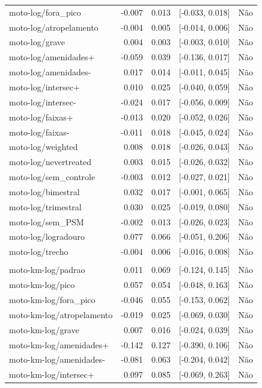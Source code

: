 \begin{longtable}{lrrcl}
moto-log/fora\_pico & -0.007 & 0.013 & {}[-0.033, 0.018] & Não\\
moto-log/atropelamento & -0.004 & 0.005 & {}[-0.014, 0.006] & Não\\
moto-log/grave & 0.004 & 0.003 & {}[-0.003, 0.010] & Não\\
moto-log/amenidades+ & -0.059 & 0.039 & {}[-0.136, 0.017] & Não\\
moto-log/amenidades- & 0.017 & 0.014 & {}[-0.011, 0.045] & Não\\
moto-log/intersec+ & 0.010 & 0.025 & {}[-0.040, 0.059] & Não\\
moto-log/intersec- & -0.024 & 0.017 & {}[-0.056, 0.009] & Não\\
moto-log/faixas+ & -0.013 & 0.020 & {}[-0.052, 0.026] & Não\\
moto-log/faixas- & -0.011 & 0.018 & {}[-0.045, 0.024] & Não\\
moto-log/weighted & 0.008 & 0.018 & {}[-0.026, 0.043] & Não\\
moto-log/nevertreated & 0.003 & 0.015 & {}[-0.026, 0.032] & Não\\
moto-log/sem\_controle & -0.003 & 0.012 & {}[-0.027, 0.021] & Não\\
moto-log/bimestral & 0.032 & 0.017 & {}[-0.001, 0.065] & Não\\
moto-log/trimestral & 0.030 & 0.025 & {}[-0.019, 0.080] & Não\\
moto-log/sem\_PSM & -0.002 & 0.013 & {}[-0.026, 0.023] & Não\\
moto-log/logradouro & 0.077 & 0.066 & {}[-0.051, 0.206] & Não\\
moto-log/trecho & -0.004 & 0.006 & {}[-0.016, 0.008] & Não\\
 &  &  &  & \\
moto-km-log/padrao & 0.011 & 0.069 & {}[-0.124, 0.145] & Não\\
moto-km-log/pico & 0.057 & 0.054 & {}[-0.048, 0.163] & Não\\
moto-km-log/fora\_pico & -0.046 & 0.055 & {}[-0.153, 0.062] & Não\\
moto-km-log/atropelamento & -0.019 & 0.025 & {}[-0.069, 0.030] & Não\\
moto-km-log/grave & 0.007 & 0.016 & {}[-0.024, 0.039] & Não\\
moto-km-log/amenidades+ & -0.142 & 0.127 & {}[-0.390, 0.106] & Não\\
moto-km-log/amenidades- & -0.081 & 0.063 & {}[-0.204, 0.042] & Não\\
moto-km-log/intersec+ & 0.097 & 0.085 & {}[-0.069, 0.263] & Não\\

\end{longtable}
